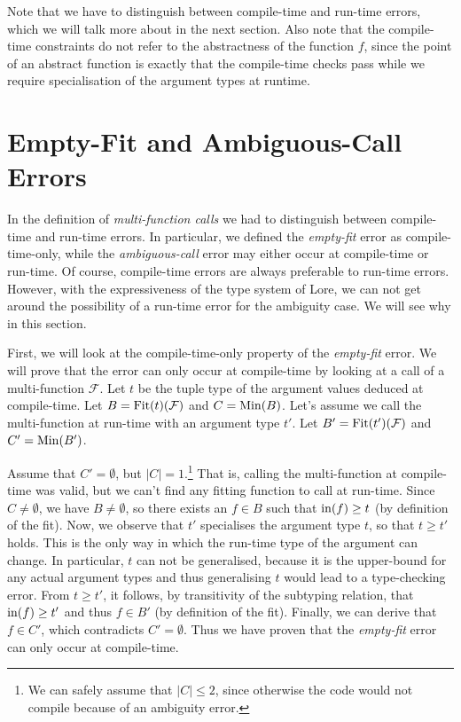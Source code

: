 \noindent Note that we have to distinguish between compile-time and run-time errors, which we will talk more about in the next section. Also note that the compile-time constraints do not refer to the abstractness of the function $f$, since the point of an abstract function is exactly that the compile-time checks pass while we require specialisation of the argument types at runtime.



\section{Empty-Fit and Ambiguous-Call Errors} \label{section:empty-fit-ambiguous-call}

In the definition of \textit{multi-function calls} we had to distinguish between compile-time and run-time errors. In particular, we defined the \textit{empty-fit} error as compile-time-only, while the \textit{ambiguous-call} error may either occur at compile-time or run-time. Of course, compile-time errors are always preferable to run-time errors. However, with the expressiveness of the type system of Lore, we can not get around the possibility of a run-time error for the ambiguity case. We will see why in this section.

\bigskip

\noindent First, we will look at the compile-time-only property of the \textit{empty-fit} error. We will prove that the error can only occur at compile-time by looking at a call of a multi-function $\mathcal{F}$. Let $t$ be the tuple type of the argument values deduced at compile-time. Let $B = \operatorname{Fit}(t)(\mathcal{F})$ and $C = \operatorname{Min}(B)$. Let's assume we call the multi-function at run-time with an argument type $t'$. Let $B' = \operatorname{Fit}(t')(\mathcal{F})$ and $C' = \operatorname{Min}(B')$. 

Assume that $C' = \emptyset$, but $|C| = 1$.\footnote{We can safely assume that $|C| \leq 2$, since otherwise the code would not compile because of an ambiguity error.} That is, calling the multi-function at compile-time was valid, but we can't find any fitting function to call at run-time. Since $C \neq \emptyset$, we have $B \neq \emptyset$, so there exists an $f \in B$ such that $\operatorname{in}(f) \geq t$ (by definition of the fit). Now, we observe that $t'$ specialises the argument type $t$, so that $t \geq t'$ holds. This is the only way in which the run-time type of the argument can change. In particular, $t$ can not be generalised, because it is the upper-bound for any actual argument types and thus generalising $t$ would lead to a type-checking error. From $t \geq t'$, it follows, by transitivity of the subtyping relation, that $\operatorname{in}(f) \geq t'$ and thus $f \in B'$ (by definition of the fit). Finally, we can derive that $f \in C'$, which contradicts $C' = \emptyset$. Thus we have proven that the \textit{empty-fit} error can only occur at compile-time.

